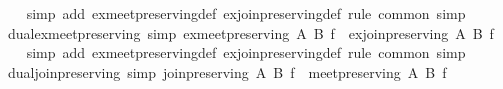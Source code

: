 \begin{isabellebody}
%
\isadelimproof
\ \ %
\endisadelimproof
%
\isatagproof
{}\isamarkupfalse%
\ {}simp\ add{}\ ex{}meet{}preserving{}def\ ex{}join{}preserving{}def{}\ {}rule\ common{}{}{}\ simp{}%
\endisatagproof
{\isafoldproof}%
%
\isadelimproof
\isanewline
%
\endisadelimproof
\isanewline
{}\isamarkupfalse%
\ dual{}ex{}meet{}preserving\ {}simp{}{}\ {}ex{}meet{}preserving\ {}A{}{}\ {}B{}{}\ f\ {}\ ex{}join{}preserving\ A\ B\ f{}\isanewline
%
\isadelimproof
\ \ %
\endisadelimproof
%
\isatagproof
{}\isamarkupfalse%
\ {}simp\ add{}\ ex{}meet{}preserving{}def\ ex{}join{}preserving{}def{}\ {}rule\ common{}{}{}\ simp{}%
\endisatagproof
{\isafoldproof}%
%
\isadelimproof
\isanewline
%
\endisadelimproof
\isanewline
{}\isamarkupfalse%
\ dual{}join{}preserving\ {}simp{}{}\ {}join{}preserving\ {}A{}{}\ {}B{}{}\ f\ {}\ meet{}preserving\ A\ B\ f{}\isanewline

\end{isabellebody}
